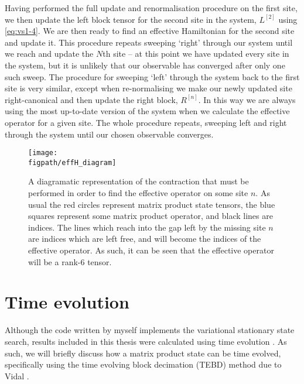 Having performed the full update and renormalisation procedure on the first site, we then update the left block tensor for the second site in the system, \(L^{[2]}\) using \cref{eq:vs1-4}. We are then ready to find an effective Hamiltonian for the second site and update it. This procedure repeats sweeping `right' through our system until we reach and update the \(N\)th site -- at this point we have updated every site in the system, but it is unlikely that our observable has converged after only one such sweep. The procedure for sweeping `left' through the system back to the first site is very similar, except when re-normalising we make our newly updated site right-canonical and then update the right block, \(R^{[n]}\). In this way we are always using the most up-to-date version of the system when we calculate the effective operator for a given site. The whole procedure repeats, sweeping left and right through the system until our chosen observable converges.

\begin{figure}[ht!]
\centering
\texttt{[image: \\figpath/effH\_diagram]}
\caption{A diagramatic representation of the contraction that must be performed in order to find the effective operator on some site \(n\). As usual the red circles represent matrix product state tensors, the blue squares represent some matrix product operator, and black lines are indices. The lines which reach into the gap left by the missing site \(n\) are indices which are left free, and will become the indices of the effective operator. As such, it can be seen that the effective operator will be a rank-6 tensor.}
\label{fig:vs1-4}
\end{figure}

\section{Time evolution}
Although the code written by myself implements the variational stationary state search, results included in this thesis were calculated using time evolution \cite{Brown2018}. As such, we will briefly discuss how a matrix product state can be time evolved, specifically using the time evolving block decimation (TEBD) method due to Vidal \cite{Vidal2003}.

